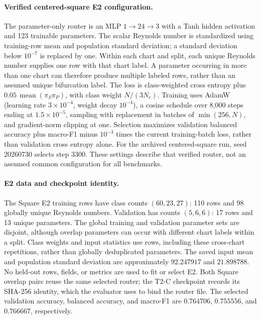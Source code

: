 \paragraph{Verified centered-square E2 configuration.}
The parameter-only router is an MLP $1\to24\to3$ with a Tanh hidden activation and 123 trainable parameters. The scalar Reynolds number is standardized using training-row mean and population standard deviation; a standard deviation below $10^{-7}$ is replaced by one. Within each chart and split, each unique Reynolds number supplies one row with that chart label. A parameter occurring in more than one chart can therefore produce multiple labeled rows, rather than an assumed unique bifurcation label. The loss is class-weighted cross entropy plus $0.05\,\operatorname{mean}(\pi_S\pi_P)$, with class weight $N/(3N_c)$. Training uses AdamW (learning rate $3\times10^{-4}$, weight decay $10^{-4}$), a cosine schedule over 8,000 steps ending at $1.5\times10^{-5}$, sampling with replacement in batches of $\min(256,N)$, and gradient-norm clipping at one. Selection maximizes validation balanced accuracy plus macro-F1 minus $10^{-3}$ times the current training-batch loss, rather than validation cross entropy alone. For the archived centered-square run, seed 20260730 selects step 3300. These settings describe that verified router, not an assumed common configuration for all benchmarks.

\paragraph{E2 data and checkpoint identity.}
The Square E2 training rows have class counts $(60,23,27)$:
110 rows and 98 globally unique Reynolds numbers.
Validation has counts $(5,6,6)$: 17 rows and 13 unique parameters.
The global training and validation parameter sets are disjoint,
although overlap parameters can occur with different chart labels
within a split. Class weights and input statistics use rows,
including these cross-chart repetitions, rather than globally
deduplicated parameters. The saved input mean and population
standard deviation are approximately $92.247917$ and $21.898788$.
No held-out rows, fields, or metrics are used to fit or select E2.
Both Square overlap pairs reuse the same selected router; the
T2-C checkpoint records its SHA-256 identity, which the evaluator
uses to bind the router file.
The selected validation accuracy, balanced accuracy, and macro-F1
are $0.764706$, $0.755556$, and $0.766667$, respectively.

